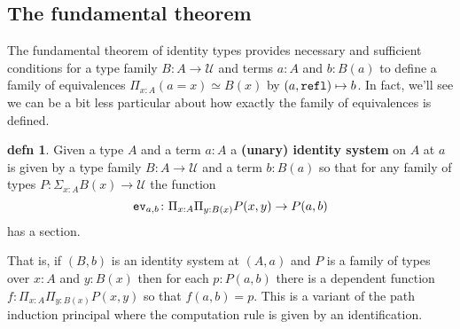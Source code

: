 \documentclass{amsart}
\theoremstyle{theorem}
\theoremstyle{definition}
\newtheorem*{defn}{defn}
\theoremstyle{remark}
\newcommand{\0}{\mathbbe{0}}
\newcommand{\1}{\mathbbe{1}}
\newcommand{\2}{\mathbbe{2}}
\newcommand{\3}{\mathbbe{3}}
\newcommand{\4}{\mathbbe{4}}
\newcommand{\term}[1]{{\textup{\texttt{#1}}}}
\newcommand{\refl}{\term{refl}}
\newcommand{\UU}{{\mathcal{U}}}
\newcommand{\ev}{\term{ev}}
\begin{document}
\subsection*{The fundamental theorem}

The fundamental theorem of identity types provides necessary and sufficient conditions for a type family $B \colon A \to \UU$ and terms $a : A$ and $b : B(a)$ to define a family of equivalences $\Pi_{x:A}(a=x) \simeq B(x)$ by $(a,\refl)\mapsto b$. In fact, we'll see we can be a bit less particular about how exactly the family of equivalences is defined.

\begin{defn} Given a type $A$ and a term $a:A$ a \textbf{(unary) identity system} on $A$ at $a$ is given by a type family $B : A \to \UU$ and a term $b : B(a)$ so that for any family of types $P \colon \Sigma_{x:A}B(x) \to \UU$ the function
\[ \ev_{a,b} \colon \Pi_{x:A} \Pi_{y:B(x)}P(x,y) \to P(a,b)\] has a section.
\end{defn}

That is, if $(B,b)$ is an identity system at $(A,a)$ and $P$ is a family of types over $x:A$ and $y:B(x)$ then for each $p : P(a,b)$ there is a dependent function $f :\Pi_{x:A} \Pi_{y:B(x)} P(x,y)$ so that $f(a,b) = p$. This is a variant of the path induction principal where the computation rule is given by an identification.
\end{document}
